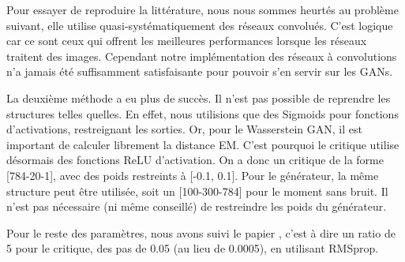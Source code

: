  	Pour essayer de reproduire la littérature, nous nous sommes heurtés au problème suivant, elle utilise quasi-systématiquement des réseaux convolués. C'est logique car ce sont ceux qui offrent les meilleures performances lorsque les réseaux traitent des images. Cependant notre implémentation des réseaux à convolutions n'a jamais été suffisamment satisfaisante pour pouvoir s'en servir sur les GANs.

 	La deuxième méthode a eu plus de succès. Il n'est pas possible de reprendre les structures telles quelles. En effet, nous utilisions que des Sigmoids pour fonctions d'activations, restreignant les sorties. Or, pour le Wasserstein GAN, il est important de calculer librement la distance EM. C'est pourquoi le critique utilise désormais des fonctions ReLU d'activation. On a donc un critique de la forme [784-20-1], avec des poids restreints à [-0.1, 0.1]. Pour le générateur, la même structure peut être utilisée, soit un [100-300-784] pour le moment sans bruit. Il n'est pas nécessaire (ni même conseillé) de restreindre les poids du générateur.

 	Pour le reste des paramètres, nous avons suivi le papier \cite{arjovsky_wasserstein_2017}, c'est à dire un ratio de 5 pour le critique, des pas de 0.05 (au lieu de 0.0005), en utilisant RMSprop.

